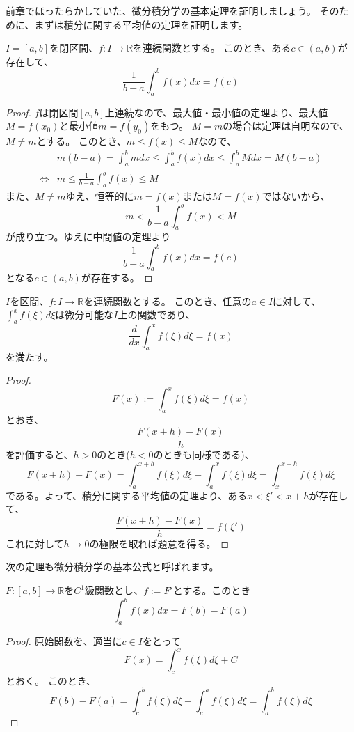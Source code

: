 前章でほったらかしていた、微分積分学の基本定理を証明しましょう。
そのために、まずは積分に関する平均値の定理を証明します。
\begin{theorem}[積分の平均値の定理]
  $I=[a,b]$を閉区間、$f:I\to\mathbb{R}$を連続関数とする。
  このとき、ある$c\in(a,b)$が存在して、
  \[
    \frac1{b-a}\int_a^bf(x)dx=f(c)
  \]
\end{theorem}
\begin{proof}
  $f$は閉区間$[a,b]$上連続なので、最大値・最小値の定理より、最大値$M=f(x_0)$と最小値$m=f(y_0)$をもつ。
  $M=m$の場合は定理は自明なので、$M\neq m$とする。
  このとき、$m\leq f(x) \leq M$なので、
  \begin{align*}
    &m(b-a)=\int_a^bmdx\leq\int_a^b f(x)dx\leq\int_a^bMdx=M(b-a)\\
    \iff&m\leq\frac1{b-a}\int_a^bf(x)\leq M
  \end{align*}
  また、$M\neq m$ゆえ、恒等的に$m=f(x)$または$M=f(x)$ではないから、
  \[
    m<\frac1{b-a}\int_a^bf(x)< M
  \]
  が成り立つ。ゆえに中間値の定理より
  \[
    \frac1{b-a}\int_a^bf(x)dx=f(c)
  \]
  となる$c\in(a,b)$が存在する。
\end{proof}

\begin{theorem}[微分積分学の基本定理]
  $I$を区間、$f:I\to\mathbb{R}$を連続関数とする。
  このとき、任意の$a\in I$に対して、$\int_a^x f(\xi)d\xi$は微分可能な$I$上の関数であり、
  \[
    \frac{d}{dx}\int_a^x f(\xi)d\xi=f(x)
  \]
  を満たす。
\end{theorem}
\begin{proof}
  \[
    F(x):=\int_a^x f(\xi)d\xi=f(x)
  \]
  とおき、
  \[
    \frac{F(x+h)-F(x)}{h}
  \]
  を評価すると、$h>0$のとき($h<0$のときも同様である)、
  \[
    F(x+h)-F(x)=\int_a^{x+h} f(\xi) d\xi+\int_a^x f(\xi)d\xi=\int_x^{x+h}f(\xi)d\xi
  \]
  である。よって、積分に関する平均値の定理より、ある$x<\xi'<x+h$が存在して、
  \[
    \frac{F(x+h)-F(x)}{h}=f(\xi')
  \]
  これに対して$h\to0$の極限を取れば題意を得る。
\end{proof}

次の定理も微分積分学の基本公式と呼ばれます。
\begin{corollary}
  $F:[a,b]\to\mathbb{R}$を$C^1$級関数とし、$f:=F'$とする。このとき
  \[
    \int_a^b f(x)dx=F(b)-F(a)
  \]
\end{corollary}
\begin{proof}
  原始関数を、適当に$c\in I$をとって
  \[
    F(x)=\int_c^xf(\xi)d\xi+C
  \]
  とおく。
  このとき、
  \[
    F(b)-F(a)=\int_c^b f(\xi)d\xi + \int_c^af(\xi)d\xi=\int_a^bf(\xi)d\xi
  \]
\end{proof}

